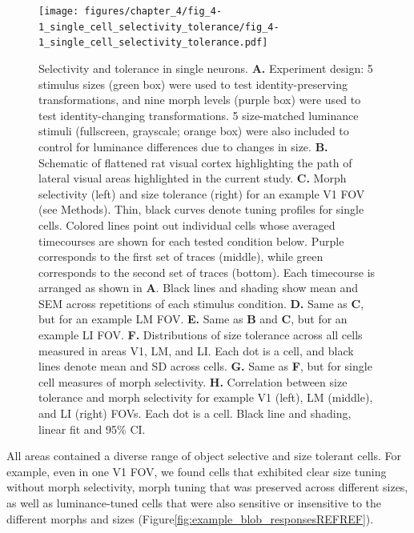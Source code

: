 \begin{figure}[t!]
    \texttt{[image: figures/chapter\_4/fig\_4-1\_single\_cell\_selectivity\_tolerance/fig\_4-1\_single\_cell\_selectivity\_tolerance.pdf]}
    \vspace{.1in}
    \caption[Selectivity and tolerance in single neurons]{Selectivity and tolerance in single neurons. 
    \textbf{A.} Experiment design:  5 stimulus sizes (green box) were used to test identity-preserving transformations, and nine morph levels (purple box) were used to test identity-changing transformations. 5 size-matched luminance stimuli (fullscreen, grayscale; orange box) were also included to control for luminance differences due to changes in size. 
    \textbf{B.} Schematic of flattened rat visual cortex highlighting the path of lateral visual areas highlighted in the current study. \textbf{C.} Morph selectivity (left) and size tolerance (right) for an example V1 FOV (see Methods). Thin, black curves denote tuning profiles for single cells. Colored lines point out individual cells whose averaged timecourses are shown for each tested condition below. Purple corresponds to the first set of traces (middle), while green corresponds to the second set of traces (bottom). Each timecourse is arranged as shown in \textbf{A}. Black lines and shading show mean and SEM across repetitions of each stimulus condition. 
    \textbf{D.} Same as \textbf{C}, but for an example LM FOV.
    \textbf{E.} Same as \textbf{B} and \textbf{C}, but for an example LI FOV.
    \textbf{F.} Distributions of size tolerance across all cells measured in areas V1, LM, and LI. Each dot is a cell, and black lines denote mean and SD across cells.
    \textbf{G.} Same as \textbf{F}, but for single cell measures of morph selectivity. 
    \textbf{H.} Correlation between size tolerance and morph selectivity for example V1 (left), LM (middle), and LI (right) FOVs. Each dot is a cell. Black line and shading, linear fit and 95\% CI.
    \label{fig:selectivity_tolerance}}
\end{figure}

All areas contained a diverse range of object selective and size tolerant cells. For example, even in one V1 FOV, we found cells that exhibited clear size tuning without morph selectivity, morph tuning that was preserved across different sizes, as well as luminance-tuned cells that were also sensitive or insensitive to the different morphs and sizes (Figure\ref{fig:example_blob_responsesREFREF}). 

